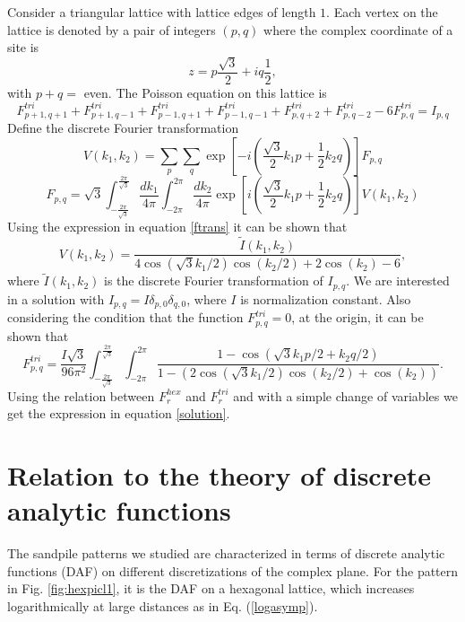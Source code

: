 \documentclass[11pt,a4paper]{book}
\begin{document}
Consider a triangular lattice with lattice edges of length $1$. Each
vertex on the lattice is denoted by a pair of integers $\left( p, q \right)$ where the complex coordinate
of a site is
\begin{equation}
z=p\frac{\sqrt{3}}{2}+iq\frac{1}{2},
\end{equation}
with $p+q=$ even.
The Poisson equation on this lattice is
\begin{equation}
F^{tri}_{p+1,q+1}+F^{tri}_{p+1,q-1}+F^{tri}_{p-1,q+1}+F^{tri}_{p-1,q-1}+F^{tri}_{p,q+2}+F^{tri}_{p,q-2}-6F^{tri}_{p,q}=I_{p,q}
\label{poisson2}
\end{equation}
Define the discrete Fourier transformation
\begin{equation}
V\left( k_{1}, k_{2} \right)=\sum_{p}\sum_{q}\exp\left[-i\left( \frac{\sqrt{3}}{2}k_{1}p+\frac{1}{2}k_{2}q \right)\right]F_{p,q}
\end{equation}
\begin{equation}
F_{p,q}=\sqrt{3}\int_{-\frac{2\pi}{\sqrt{3}}}^{\frac{2\pi}{\sqrt{3}}}\frac{dk_{1}}{4\pi} \int_{-2\pi}^{2\pi}\frac{dk_{2}}{4\pi}\exp\left[i\left( \frac{\sqrt{3}}{2}k_{1}p+\frac{1}{2}k_{2}q \right)\right]V\left( k_{1},k_{2} \right)
\label{ftrans}
\end{equation}
Using the expression in equation \ref{ftrans} it can be shown that
\begin{equation}
V\left( k_{1},k_{2} \right)=\frac{\widetilde{I}\left( k_{1}, k_{2} \right)}{4\cos\left( \sqrt{3}k_{1}/2 \right)\cos\left( k_{2}/2 \right)+2\cos\left( k_{2} \right)-6},
\end{equation}
where $\widetilde{I}\left( k_{1},k_{2} \right)$ is the discrete Fourier transformation of $I_{p, q}$. We are interested in a solution with
$I_{p,q}=I\delta_{p,0}\delta_{q,0}$, where $I$ is normalization constant. Also
considering the condition that the function $F_{p,q}^{tri}=0$, at the origin, it can be shown that
\begin{equation}
F^{tri}_{p,q}=\frac{I\sqrt{3}}{96\pi^{2}}\int_{-\frac{2\pi}{\sqrt{3}}}^{\frac{2\pi}{\sqrt{3}}}\int_{-2\pi}^{2\pi}\frac{1-\cos\left( \sqrt{3}k_{1}p/2+k_{2}q/2 \right)}{1-\left( 2\cos\left( \sqrt{3}k_{1}/2 \right)\cos\left( k_{2}/2 \right)+\cos\left( k_{2} \right) \right)}.
\end{equation}
Using the relation between $F_{r}^{hex}$ and $F_{r}^{tri}$ and with a simple change of variables we get the expression in equation \ref{solution}.




\chapter{Relation to the theory of discrete analytic functions
\label{apndx:dhf}}
The sandpile patterns we studied are characterized in terms of
discrete analytic functions (DAF) on different discretizations of the
complex plane. For the pattern in Fig. \ref{fig:hexpicl1}, it is the DAF
on a hexagonal lattice, which increases logarithmically at large
distances as in Eq. (\ref{logasymp}).
\end{document}
